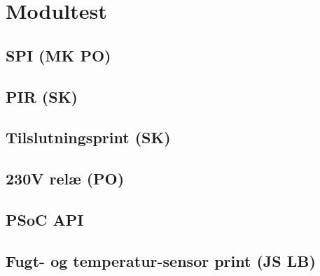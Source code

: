 \chapter{Modultest}

\section{SPI (MK PO)}


\section{PIR (SK)}


\section{Tilslutningsprint (SK)}


\section{230V relæ (PO)}


\section{PSoC API}


\section{Fugt- og temperatur-sensor print (JS LB)}




